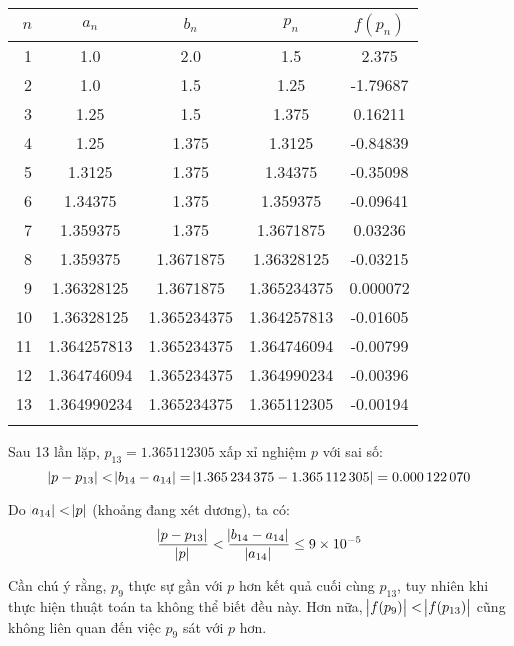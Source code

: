 \documentclass[../../Lectures.tex]{subfiles}
\begin{document}
\begin{exmp}
    \begin{tabular}{ r S[table-format=1.9] S[table-format=1.9] S[table-format=1.9] S[table-format=-1.6] }    %
        \\
        \toprule
         {\(n\)} &   {\(a_n\)}   &   {\(b_n\)}   &   {\(p_n\)}   & {\(f(p_n)\)} \\
          &  1.0          &  2.0          &  1.5          &   2.375      \\
              2  &  1.0          &  1.5          &  1.25         &  -1.79687    \\
              3  &  1.25         &  1.5          &  1.375        &   0.16211    \\
              4  &  1.25         &  1.375        &  1.3125       &  -0.84839    \\
              5  &  1.3125       &  1.375        &  1.34375      &  -0.35098    \\
              6  &  1.34375      &  1.375        &  1.359375     &  -0.09641    \\
              7  &  1.359375     &  1.375        &  1.3671875    &   0.03236    \\
              8  &  1.359375     &  1.3671875    &  1.36328125   &  -0.03215    \\
              9  &  1.36328125   &  1.3671875    &  1.365234375  &   0.000072   \\
             10  &  1.36328125   &  1.365234375  &  1.364257813  &  -0.01605    \\
             11  &  1.364257813  &  1.365234375  &  1.364746094  &  -0.00799    \\
             12  &  1.364746094  &  1.365234375  &  1.364990234  &  -0.00396    \\
             13  &  1.364990234  &  1.365234375  &  1.365112305  &  -0.00194    \\
        \bottomrule                                                             \\    %
    \end{tabular}

    Sau 13 lần lặp, \(p_{13} = \num{1.365112305}\) xấp xỉ nghiệm \(p\) với sai số:
    \[\abs{p - p_{13}} < \abs{b_{14} - a_{14}} = \abs{\num{1.365234375} - \num{1.365112305}} = \num{0.000122070}\]

    Do \(\abs{a_{14}} < \abs{p}\) (khoảng đang xét dương), ta có:
    \[\frac{\abs{p - p_{13}}}{\abs{p}} < \frac{\abs{b_{14} - a_{14}}}{\abs{a_{14}}} \leq \num{9e-5}\]

    Cần chú ý rằng, \(p_9\) thực sự gần với \(p\) hơn kết quả cuối cùng
    \(p_{13}\), tuy nhiên khi thực hiện thuật toán ta không thể biết đều này.
    Hơn nữa, \(\abs{f(p_9)} < \abs{f(p_{13})}\) cũng không liên quan đến việc
    \(p_9\) sát với \(p\) hơn.
\end{exmp}
\end{document}
